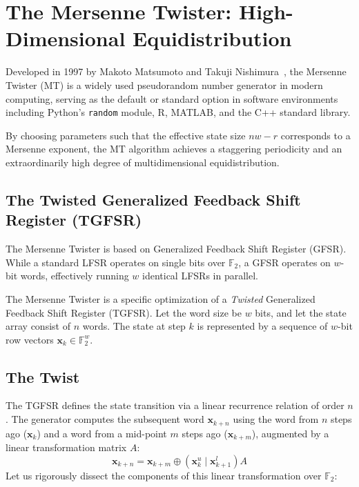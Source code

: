 
\section{The Mersenne Twister: High-Dimensional Equidistribution}

Developed in 1997 by Makoto Matsumoto and Takuji Nishimura~\cite{matsumoto1998mersenne}, the Mersenne Twister (MT) is a widely used pseudorandom number generator in modern computing, serving as the default or standard option in software environments including Python's \texttt{random} module, R, MATLAB, and the C++ standard library.

By choosing parameters such that the effective state size $nw-r$ corresponds to a Mersenne exponent, the MT algorithm achieves a staggering periodicity and an extraordinarily high degree of multidimensional equidistribution.

\subsection{The Twisted Generalized Feedback Shift Register (TGFSR)}

The Mersenne Twister is based on Generalized Feedback Shift Register (GFSR). While a standard LFSR operates on single bits over $\mathbb{F}_2$, a GFSR operates on $w$-bit words, effectively running $w$ identical LFSRs in parallel.

The Mersenne Twister is a specific optimization of a \textit{Twisted} Generalized Feedback Shift Register (TGFSR). Let the word size be $w$ bits, and let the state array consist of $n$ words. The state at step $k$ is represented by a sequence of $w$-bit row vectors $\mathbf{x}_k \in \mathbb{F}_2^w$. 

\subsection{The Twist}
The TGFSR defines the state transition via a linear recurrence relation of order $n$. The generator computes the subsequent word $\mathbf{x}_{k+n}$ using the word from $n$ steps ago ($\mathbf{x}_k$) and a word from a mid-point $m$ steps ago ($\mathbf{x}_{k+m}$), augmented by a linear transformation matrix $A$:
\[
\mathbf{x}_{k+n} = \mathbf{x}_{k+m} \oplus \left( \mathbf{x}_k^u \mid \mathbf{x}_{k+1}^l \right) A
\]
Let us rigorously dissect the components of this linear transformation over $\mathbb{F}_2$:

